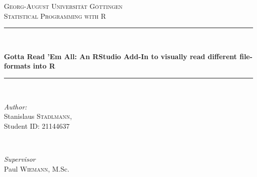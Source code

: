 \documentclass[12pt]{article} %
\begin{document}
\begin{titlepage}
\thispagestyle{empty}
\newcommand{\HRule}{\rule{\linewidth}{0.6mm}} %

\center %
 

\textsc{Georg-August Universität G\"ottingen}\\[1.5cm] %
\textsc{Statistical Programming with R}\\[0.5cm] %


\HRule \\[0.4cm]
\begin{spacing}{1.5}
{ \LARGE \bfseries Gotta Read 'Em All: An RStudio Add-In to visually read different file-formats into R}\\%
\end{spacing}
\HRule \\[1.5cm]


\begin{minipage}{0.4\textwidth}
\begin{flushleft} \large
\emph{Author:}\\
Stanislaus \textsc{Stadlmann},\\
Student ID: 21144637
\end{flushleft}
\end{minipage}
~
\begin{minipage}{0.4\textwidth}
\begin{flushright} \large
\emph{Supervisor} \\
Paul \textsc{Wiemann}, M.Sc.\\ %
\end{flushright}
\end{minipage}\\[4cm]


\end{titlepage}
\end{document}
